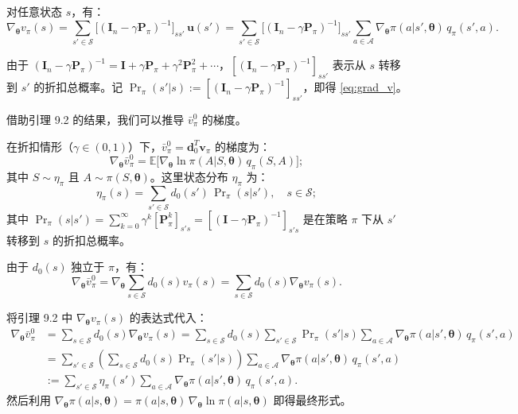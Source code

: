 \documentclass[UTF8]{article}
\begin{document}
\begin{proofbox}
对任意状态 $s$，有：
\[
\nabla_{\boldsymbol{\theta}} v_\pi(s) = \sum_{s' \in \mathcal{S}} \bigl[ (\boldsymbol{I}_n - \gamma \boldsymbol{P}_\pi)^{-1} \bigr]_{ss'} \, \boldsymbol{u}(s')
= \sum_{s' \in \mathcal{S}} \bigl[ (\boldsymbol{I}_n - \gamma \boldsymbol{P}_\pi)^{-1} \bigr]_{ss'} \sum_{a \in \mathcal{A}} \nabla_{\boldsymbol{\theta}} \pi(a|s', \boldsymbol{\theta}) \, q_\pi(s',a).
\]

由于 $(\boldsymbol{I}_n - \gamma \boldsymbol{P}_\pi)^{-1} = \boldsymbol{I} + \gamma \boldsymbol{P}_\pi + \gamma^2 \boldsymbol{P}_\pi^2 + \cdots$，$[(\boldsymbol{I}_n - \gamma \boldsymbol{P}_\pi)^{-1}]_{ss'}$ 表示从 $s$ 转移到 $s'$ 的折扣总概率。记 $\Pr_\pi(s'|s) := [(\boldsymbol{I}_n - \gamma \boldsymbol{P}_\pi)^{-1}]_{ss'}$，即得 \eqref{eq:grad_v}。
\end{proofbox}

借助引理 9.2 的结果，我们可以推导 $\bar{v}_\pi^0$ 的梯度。

\begin{theorembox}
    在折扣情形（$\gamma \in (0,1)$）下，$\bar{v}_\pi^0 = \boldsymbol{d}_0^T \boldsymbol{v}_\pi$ 的梯度为：
    \[
    \nabla_{\boldsymbol{\theta}} \bar{v}_\pi^0 = \mathbb{E}\bigl[ \nabla_{\boldsymbol{\theta}} \ln \pi(A|S, \boldsymbol{\theta}) \, q_\pi(S, A) \bigr];
    \]
    其中 $S \sim \eta_\pi$ 且 $A \sim \pi(S, \boldsymbol{\theta})$。这里状态分布 $\eta_\pi$ 为：
    \[
    \eta_\pi(s) = \sum_{s' \in \mathcal{S}} d_0(s') \, \Pr\nolimits_\pi(s|s'), \quad s \in \mathcal{S};
    \]
    其中 $\Pr_\pi(s|s') = \sum_{k=0}^{\infty} \gamma^k [\boldsymbol{P}_\pi^k]_{s's} = [(\boldsymbol{I} - \gamma \boldsymbol{P}_\pi)^{-1}]_{s's}$ 是在策略 $\pi$ 下从 $s'$ 转移到 $s$ 的折扣总概率。
\end{theorembox}

\begin{proofbox}
由于 $d_0(s)$ 独立于 $\pi$，有：
\[
\nabla_{\boldsymbol{\theta}} \bar{v}_\pi^0 = \nabla_{\boldsymbol{\theta}} \sum_{s \in \mathcal{S}} d_0(s) v_\pi(s) = \sum_{s \in \mathcal{S}} d_0(s) \nabla_{\boldsymbol{\theta}} v_\pi(s).
\]

将引理 9.2 中 $\nabla_{\boldsymbol{\theta}} v_\pi(s)$ 的表达式代入：
\begin{align*}
\nabla_{\boldsymbol{\theta}} \bar{v}_\pi^0 &= \sum_{s \in \mathcal{S}} d_0(s) \nabla_{\boldsymbol{\theta}} v_\pi(s)
= \sum_{s \in \mathcal{S}} d_0(s) \sum_{s' \in \mathcal{S}} \Pr\nolimits_\pi(s'|s) \sum_{a \in \mathcal{A}} \nabla_{\boldsymbol{\theta}} \pi(a|s', \boldsymbol{\theta}) \, q_\pi(s',a) \\
&= \sum_{s' \in \mathcal{S}} \left( \sum_{s \in \mathcal{S}} d_0(s) \Pr\nolimits_\pi(s'|s) \right) \sum_{a \in \mathcal{A}} \nabla_{\boldsymbol{\theta}} \pi(a|s', \boldsymbol{\theta}) \, q_\pi(s',a) \\
&:= \sum_{s' \in \mathcal{S}} \eta_\pi(s') \sum_{a \in \mathcal{A}} \nabla_{\boldsymbol{\theta}} \pi(a|s', \boldsymbol{\theta}) \, q_\pi(s',a).
\end{align*}
然后利用 $\nabla_{\boldsymbol{\theta}} \pi(a|s, \boldsymbol{\theta}) = \pi(a|s, \boldsymbol{\theta}) \, \nabla_{\boldsymbol{\theta}} \ln \pi(a|s, \boldsymbol{\theta})$ 即得最终形式。
\end{proofbox}
\end{document}

